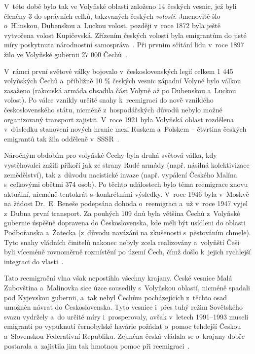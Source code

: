V~této době bylo tak ve Volyňské oblasti založeno 14 českých vesnic, jež byli členěny 3 do správních celků, takzvaných českých \emph{volostí}. Jmenovitě šlo o~Hlinskou, Dubenskou a~Luckou volost, později v~roce 1872 byla ještě vytvořena volost Kupičevská. Zřízením českých volostí byla emigrantům do jisté míry poskytnuta národnostní samospráva~\parencite{Auerhan1920}. Při prvním sčítání lidu v~roce 1897 žilo ve Volyňské gubernii 27 000 Čechů~\parencite{Vaculik2009a}.

V~rámci první světové války bojovalo v~československých legií celkem 1 445 volyňských Čechů a~přibližně 10 \% českých vesnic západní Volyně bylo válkou zasaženo (rakouská armáda obsadila část Volyně až po Dubenskou a~Luckou volost). Po válce vznikly určité snahy k~reemigraci do nově vzniklého československého státu, nicméně z~hospodářských důvodů nebylo možné organizovaný transport zajistit. V~roce 1921 byla Volyňská oblast rozdělena v~důsledku stanovení nových hranic mezi Ruskem a~Polskem -- čtvrtina českých emigrantů tak žila odděleně v~SSSR~\parencite{Hofman2020}.

Náročným obdobím pro volyňské Čechy byla druhá světová válka, kdy vystěhovalci zažili příkoří jak ze strany Rudé armády (např. násilná kolektivizace zemědělství), tak z~důvodu nacistické invaze (např. vypálení Českého Malína s~celkovými obětmi 374 osob). Po těchto událostech bylo téma reemigrace znovu aktuální, nicméně tentokrát s~konkrétními výsledky. V~roce 1946 byla v~Moskvě na žádost Dr.~E. Beneše podepsána dohoda o~reemigraci a~už v~roce 1947 vyjel z~Dubna první transport. Za pouhých 109 dnů byla většina Čechů z~Volyňské gubernie úspěšně dopravena do Československa, kde měli být usídleni do oblasti Podbořanska a~Žatecka (z~důvodu navázání na zkušenosti s~pěstováním chmele). Tyto snahy vládních činitelů nakonec nebyly zcela realizovány a~volyňští Češi byli víceméně rovnoměrně rozmístění po území Čech, čímž došlo k~jejich rychlejší integraci do vlasti~\parencite{Hofman2020}.

Tato reemigrační vlna však nepostihla všechny krajany. České vesnice Malá Zubovština a~Malinovka sice úzce sousedily s~Volyňskou oblastí, nicméně spadali pod Kyjevskou gubernii, a~tak nebyl Čechům pocházejících z~těchto osad umožněn návrat do Československa. Tyto vesnice i~přes tuhý režim Sovětského svazu vydržely a~do určité míry i~prosperovaly, avšak v~letech 1991--1993 museli emigranti po vypuknutí černobylské havárie požádat o~pomoc tehdejší Českou a~Slovenskou Federativní Republiku. Zejména česká vládala se o~krajany dobře postarala a~zajistila jim tak hmotnou pomoc při reemigraci~\parencite{Hofman2020}.

